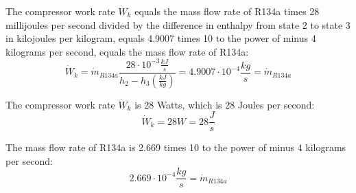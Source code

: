 The compressor work rate \( \dot{W}_k \) equals the mass flow rate of R134a times 28 millijoules per second divided by the difference in enthalpy from state 2 to state 3 in kilojoules per kilogram, equals 4.9007 times 10 to the power of minus 4 kilograms per second, equals the mass flow rate of R134a:
\[ \dot{W}_k = \dot{m}_{R134a} \frac{28 \cdot 10^{-3} \frac{kJ}{s}}{h_2 - h_3 \left( \frac{kJ}{kg} \right)} = 4.9007 \cdot 10^{-4} \frac{kg}{s} = \dot{m}_{R134a} \]

The compressor work rate \( \dot{W}_k \) is 28 Watts, which is 28 Joules per second:
\[ \dot{W}_k = 28W = 28 \frac{J}{s} \]

The mass flow rate of R134a is 2.669 times 10 to the power of minus 4 kilograms per second:
\[ 2.669 \cdot 10^{-4} \frac{kg}{s} = \dot{m}_{R134a} \]